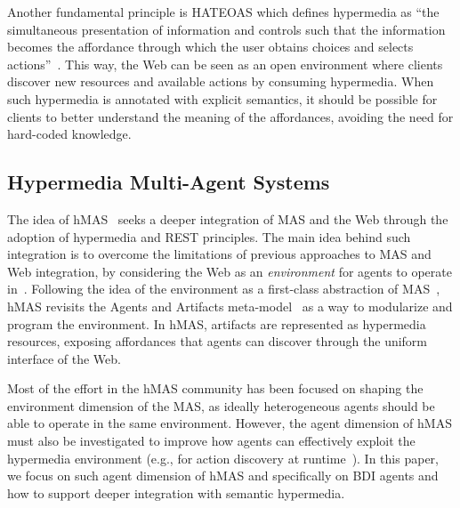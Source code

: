 \documentclass[
]{ceurart}
\begin{document}
Another fundamental principle is \ac{HATEOAS} which defines hypermedia as ``the simultaneous presentation of information and controls such that the information becomes the affordance through which the user obtains choices and selects actions''~\cite{DBLP:journals/toit/FieldingT02}.
This way, the Web can be seen as an open environment
where clients discover new resources and available actions by consuming hypermedia.
%
When such hypermedia is annotated with explicit semantics,
it should be possible for clients to better understand the meaning of the affordances,
avoiding the need for hard-coded knowledge.
%


\subsection{Hypermedia Multi-Agent Systems}

The idea of \ac{hMAS}~\cite{DBLP:conf/atal/CiorteaMGBRZ19} seeks a deeper integration of \ac{MAS} and the Web through the adoption of hypermedia and \ac{REST} principles.
%
The main idea behind such integration is to overcome the limitations of previous approaches to \ac{MAS} and Web integration, by considering the Web as an \emph{environment} for agents to operate in~\cite{ciortea2018emas}.
%
Following the idea of the environment as a first-class abstraction of \ac{MAS}~\cite{weyns2007aamas},
\ac{hMAS} revisits the Agents and Artifacts meta-model~\cite{ricci2011aamas} as a way to modularize and program the environment.
%
In \ac{hMAS}, artifacts are represented as hypermedia resources, exposing affordances that agents can discover through the uniform interface of the Web.

Most of the effort in the \ac{hMAS} community has been focused on shaping the environment dimension of the \ac{MAS}, as ideally heterogeneous agents should be able to operate in the same environment.
%
However, the agent dimension of \ac{hMAS} must also be investigated to improve how agents can effectively exploit the hypermedia environment (e.g., for action discovery at runtime~\cite{vachtsevanou2024atal}).
%
In this paper, we focus on such agent dimension of \ac{hMAS} and specifically on \ac{BDI} agents and how to support deeper integration with semantic hypermedia.
\end{document}

